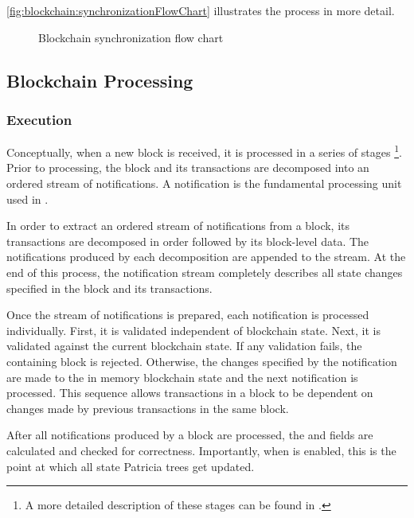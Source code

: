 \autoref{fig:blockchain:synchronizationFlowChart} illustrates the process in more detail.

\begin{figure}[H]
	\begin{center}
		
		\caption{Blockchain synchronization flow chart\label{fig:blockchain:synchronizationFlowChart}}
	\end{center}
\end{figure}

\subsection{Blockchain Processing}

\subsubsection*{Execution}

Conceptually, when a new block is received, it is processed in a series of stages
\footnote{A more detailed description of these stages can be found in .}.
Prior to processing, the block and its transactions are decomposed into an ordered stream of notifications.
A notification is the fundamental processing unit used in \codename.

In order to extract an ordered stream of notifications from a block, its transactions are decomposed in order followed by its block-level data.
The notifications produced by each decomposition are appended to the stream.
At the end of this process, the notification stream completely describes all state changes specified in the block and its transactions.

Once the stream of notifications is prepared, each notification is processed individually.
First, it is validated independent of blockchain state.
Next, it is validated against the current blockchain state.
If any validation fails, the containing block is rejected.
Otherwise, the changes specified by the notification are made to the in memory blockchain state and the next notification is processed.
This sequence allows transactions in a block to be dependent on changes made by previous transactions in the same block.

After all notifications produced by a block are processed, the   and   fields are calculated and checked for correctness.
Importantly, when  is enabled, this is the point at which all state Patricia trees get updated.

